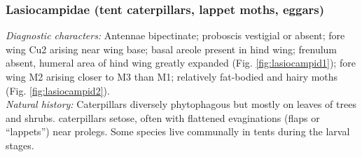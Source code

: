 \documentclass[letterpaper, 11pt]{article}
\begin{document}
\subsubsection{Lasiocampidae (tent caterpillars, lappet moths, eggars)}
\noindent{}\textit{Diagnostic characters:} Antennae bipectinate; proboscis vestigial or absent; fore wing Cu2 arising near wing base; basal areole present in hind wing; frenulum absent, humeral area of hind wing greatly expanded (Fig. \ref{fig:lasiocampid1}); fore wing M2 arising closer to M3 than M1; relatively fat-bodied and hairy moths (Fig. \ref{fig:lasiocampid2}).\\

\noindent{}\textit{Natural history:} Caterpillars diversely phytophagous but mostly on leaves of trees and shrubs. caterpillars setose, often with flattened evaginations (flaps or ``lappets'') near prolegs. Some species live communally in tents during the larval stages.
\end{document}
